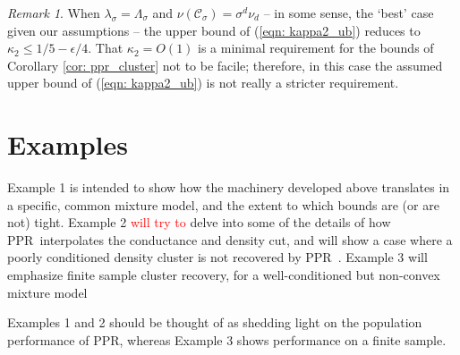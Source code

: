 \documentclass{article}
\newcommand{\1}{\mathbf{1}}
\newcommand{\Cset}{\mathcal{C}}
\newcommand{\Csig}{\Cset_{\sigma}}
\newcommand{\ppr}{{\sc PPR}}
\newcommand{\pprspace}{{\sc PPR~}}
\theoremstyle{aldenthm}
\theoremstyle{remark}
\newtheorem{remark}{Remark}
\begin{document}
\begin{remark}
	When $\lambda_{\sigma} = \Lambda_{\sigma}$ and $\nu(\Csig) = \sigma^d \nu_d$ -- in some sense, the `best' case given our assumptions -- the upper bound of (\ref{eqn: kappa2_ub}) reduces to $\kappa_2 \leq 1/5 - \epsilon/4$. That $\kappa_2 = O(1)$ is a minimal requirement for the bounds of Corollary \ref{cor: ppr_cluster} not to be facile; therefore, in this case the assumed upper bound of (\ref{eqn: kappa2_ub}) is not really a stricter requirement.
\end{remark}
\section{Examples}
\label{section: examples}

Example 1 is intended to show how the machinery developed above translates in a specific, common mixture model, and the extent to which bounds are (or are not) tight.  Example 2 \textcolor{red}{will try to} delve into some of the details of how \pprspace interpolates the conductance and density cut, and will show a case where a poorly conditioned density cluster is not recovered by \pprspace. Example 3 will emphasize finite sample cluster recovery, for a well-conditioned but non-convex mixture model

Examples 1 and 2 should be thought of as shedding light on the population performance of \ppr, whereas Example 3 shows performance on a finite sample.
\end{document}
